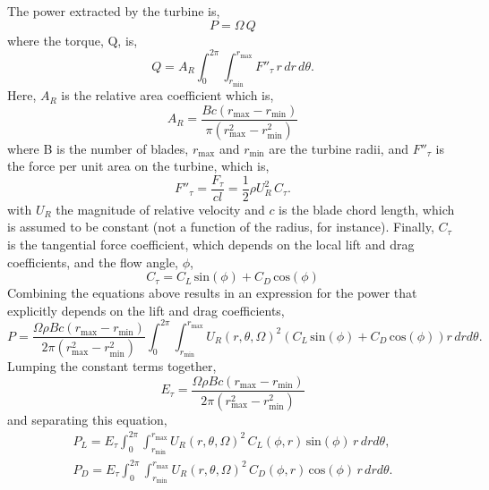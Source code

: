 The power extracted by the turbine is, 
\begin{equation}
 P = \Omega \, Q
\end{equation}
where the torque, Q, is\cite{morgado2014validation}, 
\begin{equation}
 Q = A_R \int_0^{2\pi} \int_{r_{\text{min}}}^{r_{\text{max}}}
  F''_{\tau}\, r\, dr \, d\theta.
\end{equation}
Here, $A_R$ is the relative area coefficient which is, 
\begin{equation}
A_R = \frac{B c (r_{\text{max}}-r_{\text{min}})}{\pi(r_{\text{max}}^2-r_{\text{min}}^2)}
\end{equation}
where B is the number of blades, $r_{\text{max}}$ and $r_{\text{min}}$
are the turbine radii, and $F''_{\tau}$ is the force per unit
area on the turbine, which is, 
\begin{equation}
 F''_{\tau} = \frac{F_{\tau}}{cl}= \frac{1}{2}\rho U_R^2 \, C_{\tau}.
\end{equation}
with $U_R$ the magnitude of relative velocity and $c$ is the blade chord
length, which is assumed to be constant (not a function of the radius,
for instance). Finally, $C_{\tau}$ is the tangential force coefficient,
which depends on the local lift and drag coefficients, and the
flow angle, $\phi$, 
\begin{equation}
 C_{\tau} = C_L \,\text{sin}(\phi) + C_D \,\text{cos}(\phi)
\end{equation}
Combining the equations above results in an expression for the power
that explicitly depends on the lift and drag coefficients, 
\begin{equation*}
 P = \frac{\Omega \rho B c (r_{\text{max}}-r_{\text{min}})}{2 \pi(r_{\text{max}}^2-r_{\text{min}}^2)}
\int_0^{2\pi}
\int_{r_{\text{min}}}^{r_{\text{max}}} U_R(r,\theta,\Omega)^2 \left(C_L
						     \,\text{sin}(\phi)
						     + C_D
						     \,\text{cos}(\phi)
						    \right) r\,dr d\theta. 
\end{equation*}
Lumping the constant terms together, 
\begin{equation}
E_{\tau} = \frac{\Omega \rho B c (r_{\text{max}}-r_{\text{min}})}{2
 \pi(r_{\text{max}}^2-r_{\text{min}}^2)}
\end{equation}
 and separating this equation, 
\begin{align}
 P_L = E_\tau
 \int_0^{2\pi}
  \int_{r_{\text{min}}}^{r_{\text{max}}} U_R(r,\theta,\Omega)^2 \, C_L(\phi,r)
 \,\text{sin}(\phi)\, r\,dr d\theta,  \label{lift} \\
 P_D = E_\tau
 \int_0^{2\pi}
  \int_{r_{\text{min}}}^{r_{\text{max}}} U_R(r,\theta,\Omega)^2 \, C_D(\phi,r) \,\text{cos}(\phi)\, r\,dr d\theta. \label{drag}
\end{align}
